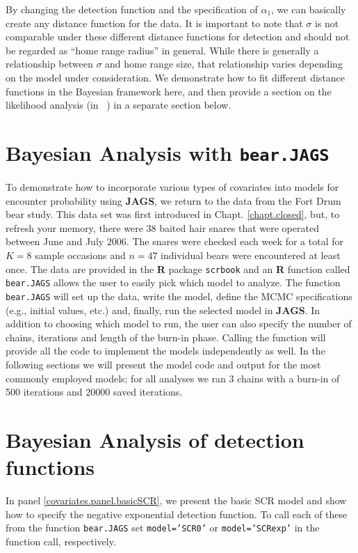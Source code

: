 By changing the detection function and the specification of
$\alpha_1$, we can basically create any distance function for the
data. It is important to note that $\sigma$ is not comparable under
these different distance functions for detection and should not be
regarded as ``home range radius'' in general.  While there is
generally a relationship between $\sigma$ and home range size, that
relationship varies depending on the model under consideration. We
demonstrate how to fit different distance functions in the Bayesian
framework here, and then provide a section on the likelihood analysis
(in \secr~) in a separate section below.

\section{Bayesian Analysis with {\tt bear.JAGS}}

To demonstrate how to incorporate various types of covariates into
models for encounter probability using {\bf JAGS}, we return to the
data from the Fort Drum bear study.  This data set was first
introduced in Chapt. \ref{chapt.closed}, but, to refresh your memory,
there were 38 baited hair snares that were operated between June and
July 2006.  The snares were checked each week for a total for $K=8$
sample occasions and $n=47$ individual bears were encountered at least
once.  The data are provided in the {\bf R} package \mbox{\tt scrbook}
and an {\bf R} function called {\tt bear.JAGS} allows the user to
easily pick which model to analyze.  The function {\tt bear.JAGS} will
set up the data, write the model, define the MCMC specifications
(e.g., initial values, etc.) and, finally, run the selected model in
{\bf JAGS}. In addition to choosing which model to run, the user can
also specify the number of chains, iterations and length of the
burn-in phase. Calling the function will provide all the code to
implement the models independently as well.  In the following sections
we will present the model code and output for the most commonly
employed models; for all analyses we ran 3 chains with a burn-in of
500 iterations and 20000 saved iterations.

\section{Bayesian Analysis of detection functions}

In panel \ref{covariates.panel.basicSCR}, we present the basic SCR
model and show how to specify the negative exponential detection
function.  To call each of these from the function {\tt bear.JAGS} set
{\tt model='SCR0'} or {\tt model='SCRexp'} in the function call,
respectively.

